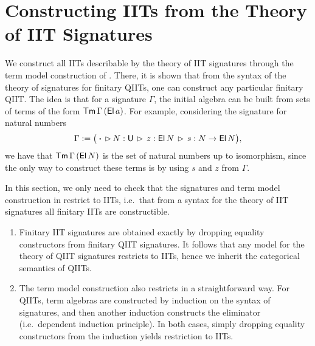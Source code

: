 \documentclass[a4paper,UKenglish,cleveref, autoref]{lipics-v2019}
\begin{document}




\section{Constructing IITs from the Theory of IIT Signatures}
\label{sec:constructingiits}

We construct all IITs describable by the theory of IIT signatures through the
term model construction of \cite{Kaposi:2019:CQI:3302515.3290315}. There, it is
shown that from the syntax of the theory of signatures for finitary QIITs, one
can construct any particular finitary QIIT. The idea is that for a signature
$\Gamma$, the initial algebra can be built from sets of terms of the form
$\mathsf{Tm}\,\Gamma\,(\mathsf{El}\,a)$. For example, considering the signature for natural
numbers
\[
  \Gamma := \big(\boldsymbol{\cdot}\,\rhd\,N:\mathsf{U}\,\rhd\,z : \mathsf{El}\,N\,\rhd\,s : N \rightarrow \mathsf{El}\,N\big),
\]
we have that $\mathsf{Tm}\,\Gamma\,(\mathsf{El}\,N)$ is the set of natural numbers up to isomorphism,
since the only way to construct these terms is by using $s$ and $z$ from $\Gamma$.

In this section, we only need to check that the signatures and term model
construction in \cite{Kaposi:2019:CQI:3302515.3290315} restrict to IITs,
i.e.\ that from a syntax for the theory of IIT signatures all finitary IITs are
constructible.

\begin{enumerate}
\item
  Finitary IIT signatures are obtained exactly by dropping equality constructors from
  finitary QIIT signatures. It follows that any model for the theory of QIIT signatures
  restricts to IITs, hence we inherit the categorical semantics of QIITs.
\item
  The term model construction also restricts in a straightforward way. For QIITs,
  term algebras are constructed by induction on the syntax of signatures, and
  then another induction constructs the eliminator (i.e.\ dependent induction
  principle). In both cases, simply dropping equality constructors from the
  induction yields restriction to IITs.
\end{enumerate}
\end{document}
